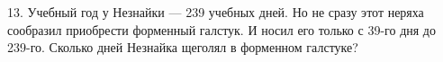 13. Учебный год у Незнайки --- 239 учебных дней. Но не сразу этот неряха сообразил приобрести форменный галстук. И носил его только с 39-го дня до 239-го. Сколько дней Незнайка щеголял в форменном галстуке?\\
